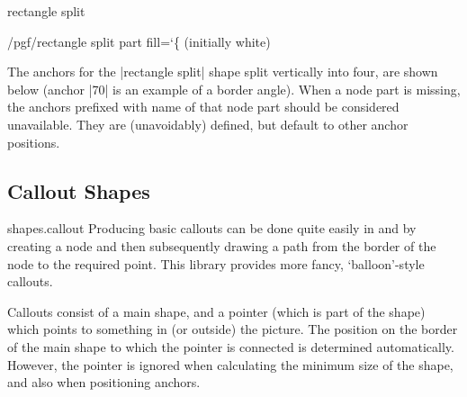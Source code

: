 \begin{shape}{rectangle split}
\begin{key}{/pgf/rectangle split part fill={\ttfamily\char`\{} (initially white)}
\end{key}
	
  The anchors for the |rectangle split| shape split vertically into four, 
  are shown below (anchor |70| is an example of a border angle). When a 
  node part is missing, the anchors prefixed with name of that node part
  should be considered unavailable. They are (unavoidably) defined, but 
  default to other anchor positions.
  
\begin{codeexample}[]
\Huge
{}
\end{codeexample}


\end{shape}






\subsection{Callout Shapes}

\begin{pgflibrary}{shapes.callout}
  Producing basic callouts can be done quite easily in \pgfname{} and 
	\tikzname{} by creating a node and then subsequently drawing a path
	from the border of the node to the required point. This library
	provides more fancy, `balloon'-style callouts.
    
\end{pgflibrary}

Callouts consist of a 
main shape, and a pointer (which is part of the shape) which points
to something in (or outside) the picture. The position on the border
of the main shape to which the pointer is connected is determined
automatically. However, the pointer is ignored when calculating the 
minimum size of the shape, and also when positioning anchors.

